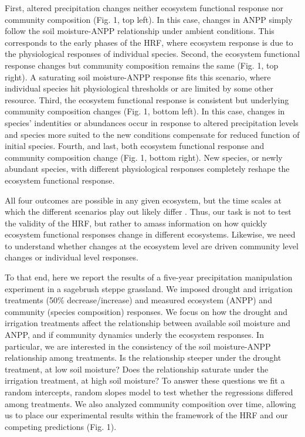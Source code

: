 \documentclass[fleqn,10pt,lineno]{wlpeerj} %
\begin{document}
First, altered precipitation changes neither ecosystem functional
response nor community composition (Fig. 1, top left). In this case,
changes in ANPP simply follow the soil moisture-ANPP relationship under
ambient conditions. This corresponds to the early phases of the HRF,
where ecosystem response is due to the physiological responses of
individual species. Second, the ecosystem functional response changes
but community composition remains the same (Fig. 1, top right). A
saturating soil moisture-ANPP response fits this scenario, where
individual species hit physiological thresholds or are limited by some
other resource. Third, the ecosystem functional response is consistent
but underlying community composition changes (Fig. 1, bottom left). In
this case, changes in species' indentities or abundances occur in
response to altered precipitation levels and species more suited to the
new conditions compensate for reduced function of initial species.
Fourth, and last, both ecosystem functional response and community
composition change (Fig. 1, bottom right). New species, or newly
abundant species, with different physiological responses completely
reshape the ecosystem functional response.

All four outcomes are possible in any given ecosystem, but the time
scales at which the different scenarios play out likely differ
\citep{Smith2009, Wilcox2016, Knapp2017}. Thus, our task is not to test
the validity of the HRF, but rather to amass information on how quickly
ecosystem functional responses change in different ecosystems. Likewise,
we need to understand whether changes at the ecosystem level are driven
community level changes or individual level responses.

To that end, here we report the results of a five-year precipitation
manipulation experiment in a sagebrush steppe grassland. We imposed
drought and irrigation treatments (50\% decrease/increase) and measured
ecosystem (ANPP) and community (species composition) responses. We focus
on how the drought and irrigation treatments affect the relationship
between available soil moisture and ANPP, and if community dynamics
underly the ecosystem responses. In particular, we are interested in the
consistency of the soil moisture-ANPP relationship among treatments. Is
the relationship steeper under the drought treatment, at low soil
moisture? Does the relationship saturate under the irrigation treatment,
at high soil moisture? To answer these questions we fit a random
intercepts, random slopes model to test whether the regressions differed
among treatments. We also analyzed community composition over time,
allowing us to place our experimental results within the framework of
the HRF and our competing predictions (Fig. 1).
\end{document}
